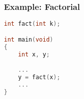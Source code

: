 \documentclass[dvipsnames]{beamer}
\begin{document}
\begin{frame}[fragile]
  \frametitle{Example: Factorial}

  \begin{lstlisting}[language=C]
int fact(int k);

int main(void)
{
    int x, y;

    ...
    y = fact(x);
    ...
}
  \end{lstlisting}
\end{frame}
%
%
%
%
%
%
%
%
%
%
%
\end{document}
